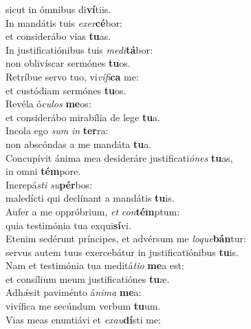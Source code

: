 \evenverse sicut in ómnibus di\textbf{ví}tiis.\\
\oddverse In mandátis tuis \textit{e}\textit{xer}\textbf{cé}bor:~\*\\
\oddverse et considerábo vias \textbf{tu}as.\\
\evenverse In justificatiónibus tuis \textit{me}\textit{di}\textbf{tá}bor:~\*\\
\evenverse non oblivíscar sermónes \textbf{tu}os.\\
\oddverse Retríbue servo tuo, vi\textit{ví}\textit{fi}\textbf{ca} me:~\*\\
\oddverse et custódiam sermónes \textbf{tu}os.\\
\evenverse Revéla ó\textit{cu}\textit{los} \textbf{me}os:~\*\\
\evenverse et considerábo mirabília de lege \textbf{tu}a.\\
\oddverse Incola ego \textit{sum} \textit{in} \textbf{ter}ra:~\*\\
\oddverse non abscóndas a me mandáta \textbf{tu}a.\\
\evenverse Concupívit ánima mea desideráre justificati\textit{ó}\textit{nes} \textbf{tu}as,~\*\\
\evenverse in omni \textbf{tém}pore.\\
\oddverse Increpá\textit{sti} \textit{su}\textbf{pér}bos:~\*\\
\oddverse maledícti qui declínant a mandátis \textbf{tu}is.\\
\evenverse Aufer a me oppróbrium, \textit{et} \textit{con}\textbf{tém}ptum:~\*\\
\evenverse quia testimónia tua exqui\textbf{sí}vi.\\
\oddverse Etenim sedérunt príncipes, et advérsum me \textit{lo}\textit{que}\textbf{bán}tur:~\*\\
\oddverse servus autem tuus exercebátur in justificatiónibus \textbf{tu}is.\\
\evenverse Nam et testimónia tua meditá\textit{ti}\textit{o} \textbf{me}a est:~\*\\
\evenverse et consílium meum justificatiónes \textbf{tu}æ.\\
\oddverse Adhǽsit paviménto á\textit{ni}\textit{ma} \textbf{me}a:~\*\\
\oddverse vivífica me secúndum verbum \textbf{tu}um.\\
\evenverse Vias meas enuntiávi et \textit{e}\textit{xau}\textbf{dí}sti me:~\*\\
